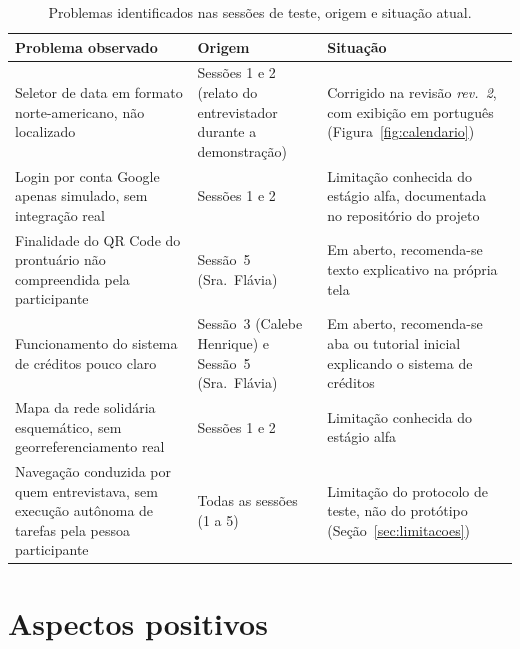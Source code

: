 \documentclass[
    12pt,
    openright,
    oneside,
    a4paper
]{abntex2}
\begin{document}
\begin{table}[H]
\centering
\small
\begin{tabular}{@{}>{\raggedright\arraybackslash}p{4.3cm}>{\raggedright\arraybackslash}p{4.3cm}>{\raggedright\arraybackslash}p{5.3cm}@{}}
\toprule
\textbf{Problema observado} & \textbf{Origem} & \textbf{Situação} \\
\midrule
Seletor de data em formato norte-americano, não localizado & Sessões 1 e 2 (relato do
entrevistador durante a demonstração) & Corrigido na revisão \textit{rev.~2}, com exibição em
português (Figura~\ref{fig:calendario}) \\
\addlinespace
Login por conta Google apenas simulado, sem integração real & Sessões 1 e 2 & Limitação
conhecida do estágio alfa, documentada no repositório do projeto \\
\addlinespace
Finalidade do QR Code do prontuário não compreendida pela participante & Sessão~5
(Sra.~Flávia) & Em aberto, recomenda-se texto explicativo na própria tela \\
\addlinespace
Funcionamento do sistema de créditos pouco claro & Sessão~3 (Calebe Henrique) e Sessão~5
(Sra.~Flávia) & Em aberto, recomenda-se aba ou tutorial inicial
explicando o sistema de créditos \\
\addlinespace
Mapa da rede solidária esquemático, sem georreferenciamento real & Sessões 1 e 2 & Limitação
conhecida do estágio alfa \\
\addlinespace
Navegação conduzida por quem entrevistava, sem execução autônoma de tarefas pela pessoa
participante & Todas as sessões (1 a 5) & Limitação do protocolo de teste, não do protótipo
(Seção~\ref{sec:limitacoes}) \\
\bottomrule
\end{tabular}
\caption{Problemas identificados nas sessões de teste, origem e situação atual.}
\label{tab:problemas}
\end{table}

\section{Aspectos positivos}
\end{document}

